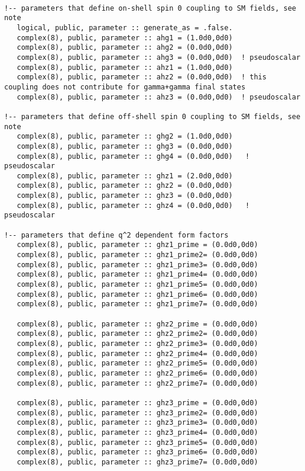 \documentclass[aps,superscriptaddress,nofootinbib]{revtex4}
\begin{document}
\begin{verbatim}

!-- parameters that define on-shell spin 0 coupling to SM fields, see note
   logical, public, parameter :: generate_as = .false.
   complex(8), public, parameter :: ahg1 = (1.0d0,0d0)
   complex(8), public, parameter :: ahg2 = (0.0d0,0d0)
   complex(8), public, parameter :: ahg3 = (0.0d0,0d0)  ! pseudoscalar
   complex(8), public, parameter :: ahz1 = (1.0d0,0d0)
   complex(8), public, parameter :: ahz2 = (0.0d0,0d0)  ! this coupling does not contribute for gamma+gamma final states
   complex(8), public, parameter :: ahz3 = (0.0d0,0d0)  ! pseudoscalar

!-- parameters that define off-shell spin 0 coupling to SM fields, see note
   complex(8), public, parameter :: ghg2 = (1.0d0,0d0)
   complex(8), public, parameter :: ghg3 = (0.0d0,0d0)
   complex(8), public, parameter :: ghg4 = (0.0d0,0d0)   ! pseudoscalar
   complex(8), public, parameter :: ghz1 = (2.0d0,0d0)
   complex(8), public, parameter :: ghz2 = (0.0d0,0d0)
   complex(8), public, parameter :: ghz3 = (0.0d0,0d0)
   complex(8), public, parameter :: ghz4 = (0.0d0,0d0)   ! pseudoscalar 

!-- parameters that define q^2 dependent form factors
   complex(8), public, parameter :: ghz1_prime = (0.0d0,0d0)
   complex(8), public, parameter :: ghz1_prime2= (0.0d0,0d0)
   complex(8), public, parameter :: ghz1_prime3= (0.0d0,0d0)
   complex(8), public, parameter :: ghz1_prime4= (0.0d0,0d0)
   complex(8), public, parameter :: ghz1_prime5= (0.0d0,0d0)
   complex(8), public, parameter :: ghz1_prime6= (0.0d0,0d0)
   complex(8), public, parameter :: ghz1_prime7= (0.0d0,0d0)

   complex(8), public, parameter :: ghz2_prime = (0.0d0,0d0)
   complex(8), public, parameter :: ghz2_prime2= (0.0d0,0d0)
   complex(8), public, parameter :: ghz2_prime3= (0.0d0,0d0)
   complex(8), public, parameter :: ghz2_prime4= (0.0d0,0d0)
   complex(8), public, parameter :: ghz2_prime5= (0.0d0,0d0)
   complex(8), public, parameter :: ghz2_prime6= (0.0d0,0d0)
   complex(8), public, parameter :: ghz2_prime7= (0.0d0,0d0)

   complex(8), public, parameter :: ghz3_prime = (0.0d0,0d0)
   complex(8), public, parameter :: ghz3_prime2= (0.0d0,0d0)
   complex(8), public, parameter :: ghz3_prime3= (0.0d0,0d0)
   complex(8), public, parameter :: ghz3_prime4= (0.0d0,0d0)
   complex(8), public, parameter :: ghz3_prime5= (0.0d0,0d0)
   complex(8), public, parameter :: ghz3_prime6= (0.0d0,0d0)
   complex(8), public, parameter :: ghz3_prime7= (0.0d0,0d0)


\end{verbatim}
\end{document}

